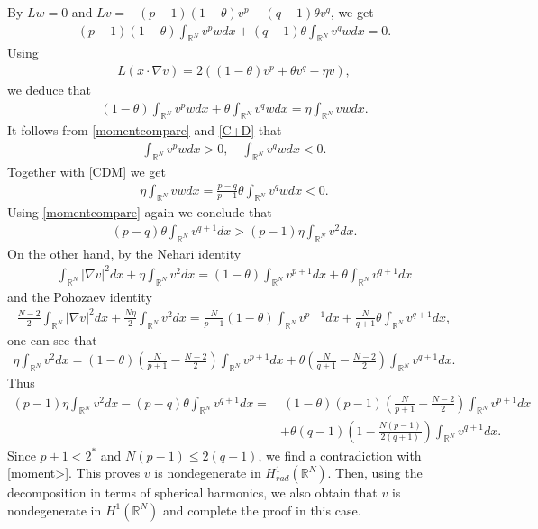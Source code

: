\documentclass{article}
\theoremstyle{definition} \theoremstyle{remark}
\numberwithin{equation}{section}
\newcommand{\R}{\mathbb{R}}
\begin{document}
	By $Lw = 0$ and $Lv = -(p-1)(1-\theta)v^p - (q-1)\theta v^q$, we get
	\begin{align} \label{C+D}
		(p-1)(1-\theta)\int_{\R^N}v^pwdx + (q-1)\theta\int_{\R^N}v^qwdx = 0.
	\end{align}
	Using
	\begin{align*}
		L (x\cdot\nabla v) = 2\left((1-\theta)v^p + \theta v^q - \eta v\right),
	\end{align*}
	we deduce that
	\begin{align} \label{CDM}
		(1-\theta)\int_{\R^N}v^pwdx + \theta\int_{\R^N}v^qwdx =  \eta\int_{\R^N}vwdx.
	\end{align}
	It follows from \eqref{momentcompare} and \eqref{C+D} that
	\begin{align*}
		\int_{\R^N}v^pwdx > 0, \quad \int_{\R^N}v^qwdx < 0.
	\end{align*}
	Together with \eqref{CDM} we get
	\begin{align*}
		\eta\int_{\R^N}vwdx = \frac{p-q}{p-1}\theta\int_{\R^N}v^qwdx < 0.
	\end{align*}
	Using \eqref{momentcompare} again we conclude that
	\begin{align} \label{moment>}
		(p-q)\theta\int_{\R^N}v^{q+1}dx > (p-1)\eta\int_{\R^N}v^2dx.
	\end{align}
On the other hand, by the Nehari identity
	\begin{align*}
		\int_{\R^N}|\nabla v|^2dx + \eta\int_{\R^N}v^2dx = (1-\theta)\int_{\R^N}v^{p+1}dx + \theta\int_{\R^N}v^{q+1}dx
	\end{align*}
	and the Pohozaev identity
	\begin{align*}
		\frac{N-2}{2}\int_{\R^N}|\nabla v|^2dx + \frac{N\eta}{2}\int_{\R^N}v^2dx = \frac{N}{p+1}(1-\theta)\int_{\R^N}v^{p+1}dx + \frac{N}{q+1}\theta\int_{\R^N}v^{q+1}dx,
	\end{align*}
	one can see that
	\begin{align*}
		\eta\int_{\R^N}v^2dx = (1-\theta)\left(\frac{N}{p+1}-\frac{N-2}{2}\right)\int_{\R^N}v^{p+1}dx + \theta\left(\frac{N}{q+1}-\frac{N-2}{2}\right)\int_{\R^N}v^{q+1}dx.
	\end{align*}
	Thus
	\begin{align*}
		(p-1)\eta\int_{\R^N}v^2dx - (p-q)\theta\int_{\R^N}v^{q+1}dx = &~ (1-\theta)(p-1) \left(\frac{N}{p+1}-\frac{N-2}{2}\right)\int_{\R^N}v^{p+1}dx \\
		& + \theta(q-1)\left(1 - \frac{N(p-1)}{2(q+1)}\right)\int_{\R^N}v^{q+1}dx.
	\end{align*}
	Since $p + 1 < 2^*$ and $N(p-1) \le 2(q+1)$, we find a contradiction with \eqref{moment>}. This proves $v$ is nondegenerate in $H_{rad}^1(\R^N)$. Then, using the decomposition in terms of spherical harmonics, we also obtain that $v$ is nondegenerate in $H^1(\R^N)$ and complete the proof in this case.	
\end{document}
